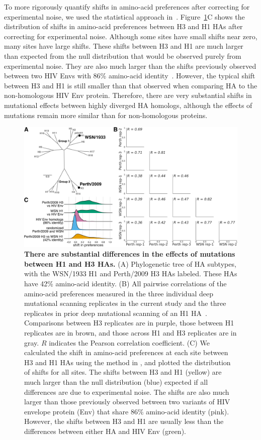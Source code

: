 \documentclass[9pt,twocolumn,twoside]{pnas-new}
\begin{document}
To more rigorously quantify shifts in amino-acid preferences after correcting for experimental noise, we used the statistical approach in~\cite{doud2015site,haddox2017mapping}.
Figure~\ref{fig:distance_distribution}C shows the distribution of shifts in amino-acid preferences between H3 and H1 HAs after correcting for experimental noise.
Although some sites have small shifts near zero, many sites have large shifts.
These shifts between H3 and H1 are much larger than expected from the null distribution that would be observed purely from experimental noise.
They are also much larger than the shifts previously observed between two HIV Envs with 86\% amino-acid identity~\cite{haddox2017mapping}.
However, the typical shift between H3 and H1 is still smaller than that observed when comparing HA to the non-homologous HIV Env protein. 
Therefore, there are very substantial shifts in mutational effects between highly diverged HA homologs, although the effects of mutations remain more similar than for non-homologous proteins.

\begin{figure}
\centering
\includegraphics[width=12cm]{figs/distance_distribution/distance_distribution.pdf}
\caption{\label{fig:distance_distribution}
{\bf There are substantial differences in the effects of mutations between H1 and H3 HAs.}
(A) Phylogenetic tree of HA subtypes, with the WSN/1933 H1 and Perth/2009 H3 HAs labeled. 
These HAs have 42\% amino-acid identity.
(B) All pairwise correlations of the amino-acid preferences measured in the three individual deep mutational scanning replicates in the current study  and the three replicates in prior deep mutational scanning of an H1 HA~\cite{doud2016accurate}.
Comparisons between H3 replicates are in purple, those between H1 replicates are in brown, and those across H1 and H3 replicates are in gray. 
$R$ indicates the Pearson correlation coefficient.
(C) We calculated the shift in amino-acid preferences at each site between H3 and H1 HAs using the method in \cite{haddox2017mapping}, and plotted the distribution of shifts for all sites.
The shifts between H3 and H1 (yellow) are much larger than the null distribution (blue) expected if all differences are due to experimental noise.
The shifts are also much larger than those previously observed between two variants of HIV envelope protein (Env) that share 86\% amino-acid identity (pink).
However, the shifts between H3 and H1 are usually less than the differences between either HA and HIV Env (green).
}
\end{figure}
\end{document}
